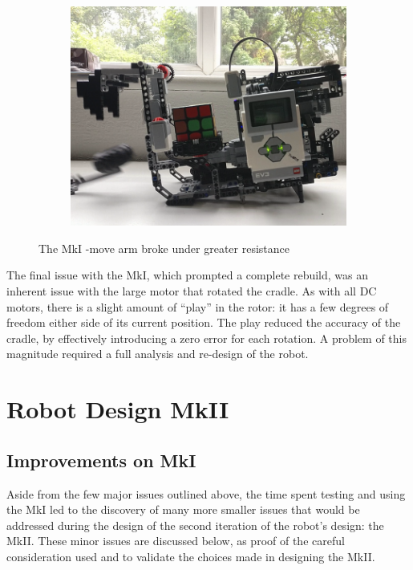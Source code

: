 \documentclass{report}
\newcommand{\move}[1]{\uppercase{\texttt{\formatmovesnospace{#1}}}-move}
\begin{document}
\begin{figure}[H]
\begin{subfigure}[b]{0.25\textwidth}
			\includegraphics[width=\textwidth]{Resources/Images/imgMkIArmCollapse3.png}
		\end{subfigure}
		\caption{The MkI \move{x} arm broke under greater resistance}
		\label{fig:mkIArmCollapse}
	\end{figure}
	
	The final issue with the MkI, which prompted a complete rebuild, was an inherent issue with the large motor that rotated the cradle. As with all DC motors, there is a slight amount of \enquote{play} in the rotor: it has a few degrees of freedom either side of its current position. The play reduced the accuracy of the cradle, by effectively introducing a zero error for each rotation. A problem of this magnitude required a full analysis and re-design of the robot.

    \section{Robot Design MkII}
	\subsection{Improvements on MkI}
	Aside from the few major issues outlined above, the time spent testing and using the MkI led to the discovery of many more smaller issues that would be addressed during the design of the second iteration of the robot's design: the MkII. These minor issues are discussed below, as proof of the careful consideration used and to validate the choices made in designing the MkII.
	
\end{document}

